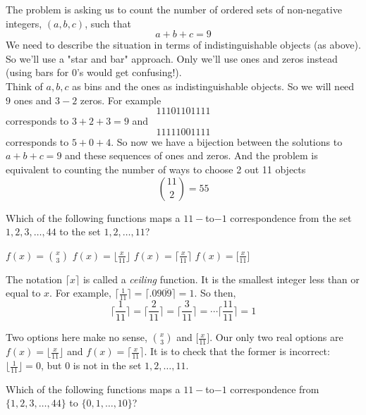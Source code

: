 \documentclass{exam}
\begin{document}
\begin{questions}
\begin{solution}
The problem is asking us to count the number of ordered sets of non-negative integers, $(a,b,c)$, such that $$a+b+c=9$$ We need to describe the situation in terms of indistinguishable objects (as above). So we'll use a "star and bar" approach. Only we'll use ones and zeros instead (using bars for $0$'s would get confusing!). \\

Think of $a,b,c$ as bins and the ones as indistinguishable objects. So we will need $9$ ones and $3-2$ zeros. For example $$11101101111$$ corresponds to $3+2+3=9$ and $$11111001111$$ corresponds to $5+0+4$. So now we have a bijection between the solutions to $a+b+c=9$ and these sequences of ones and zeros. And the problem is equivalent to counting the number of ways to choose 2 out 11 objects $${11 \choose 2}=55$$
\end{solution}


\question Which of the following functions maps a $11-$to$-1$ correspondence from the set ${1,2,3,\dots, 44}$ to the set ${1,2,\dots , 11}$?
    
    \begin{oneparchoices}
    \choice $f(x)={x \choose 3}$
    \choice $f(x)=\lfloor \frac{x}{11} \rfloor$
    \CorrectChoice $f(x)=\lceil \frac{x}{11} \rceil$
    \choice $f(x)=\lbrack \frac{x}{11} \rbrack$
    \end{oneparchoices}
    \begin{solution}
        The notation $\lceil x \rceil$ is called a \textit{ceiling} function. It is the smallest integer less than or equal to $x$. For example, $\lceil \frac{1}{11} \rceil=\lceil .09\overline{09} \rceil=1$. So then,
        $$\lceil \frac{1}{11} \rceil=\lceil \frac{2}{11} \rceil=\lceil \frac{3}{11} \rceil=\cdots \lceil \frac{11}{11} \rceil=1$$
        
        Two options here make no sense, ${x \choose 3}$ and $\lbrack \frac{x}{11} \rbrack$. Our only two real options are $f(x)=\lfloor \frac{x}{11} \rfloor$ and $f(x)=\lceil \frac{x}{11} \rceil$. It is to check that the former is incorrect: $\lfloor \frac{1}{11} \rfloor=0$, but $0$ is not in the set ${1,2,\dots , 11}$.
    \end{solution}


\question Which of the following functions maps a $11-$to$-1$ correspondence from $\{1,2,3,\dots, 44\}$ to $\{0,1,\dots , 10\}$?
    

\end{questions}
\end{document}
